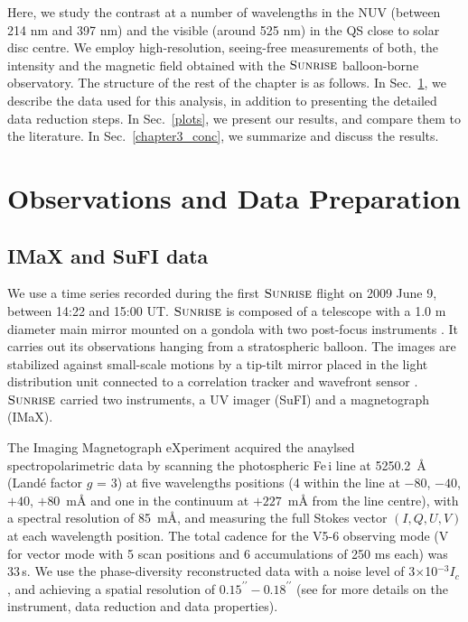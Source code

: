 \documentclass[goettingen, gauss, print]{thesis}
\begin{document}
Here, we study the contrast at a number of wavelengths in the NUV (between 214 nm and 397 nm) and the visible (around 525 nm) in the QS close to solar disc centre. We employ high-resolution, seeing-free measurements of both, the intensity and the magnetic field obtained with the $\textsc{Sunrise}$ balloon-borne observatory. The structure of the rest of the chapter is as follows. In Sec.~\ref{chapter_3_data}, we describe the data used for this analysis, in addition to presenting the detailed data reduction steps. In Sec.~\ref{plots}, we present our results, and compare them to the literature. In Sec.~\ref{chapter3_conc}, we summarize and discuss the results.

\section{Observations and Data Preparation}
\label{chapter_3_data}
\subsection{IMaX and SuFI data}
We use a time series recorded during the first $\textsc{Sunrise}$  flight on 2009 June 9, between 14:22 and 15:00 UT. $\textsc{Sunrise}$ is composed of a telescope with a 1.0 m diameter main mirror mounted on a gondola with two post-focus instruments \citep{solanki_sunrise:_2010,barthol_sunrise_2011}. It carries out its observations hanging from a stratospheric balloon. The images are stabilized against small-scale motions by a tip-tilt mirror placed in the light distribution unit connected to a correlation tracker and wavefront sensor \citep{berkefeld_wave-front_2011, gandorfer_filter_2011}. $\textsc{Sunrise}$ carried two instruments, a UV imager (SuFI) and a magnetograph (IMaX).

The Imaging Magnetograph eXperiment \citep[IMaX;][]{martinezpillet_imaging_2011} acquired the anaylsed spectropolarimetric data by scanning the photospheric Fe\,{\sc i} line at 5250.2\, \AA{} (Land{\'e} factor $g$ = 3) at five wavelengths positions (4 within the line at $-80$, $-40$, $+40$, $+80$\, m\AA{} and one in the continuum at $+227$\, m\AA{} from the line centre), with a spectral resolution of 85\, m\AA{}, and measuring the full Stokes vector $(I,Q,U,V)$ at each wavelength position. The total cadence for the V5-6 observing mode (V for vector mode with 5 scan positions and 6 accumulations of 250 ms each) was 33\,s. We use the phase-diversity reconstructed data with a noise level of 3$\times$10$^{-3} I_c$, and achieving a spatial resolution of $0.15^{\prime\prime}-0.18^{\prime\prime}$ (see \cite{martinezpillet_imaging_2011} for more details on the instrument, data reduction and data properties).
\end{document}

